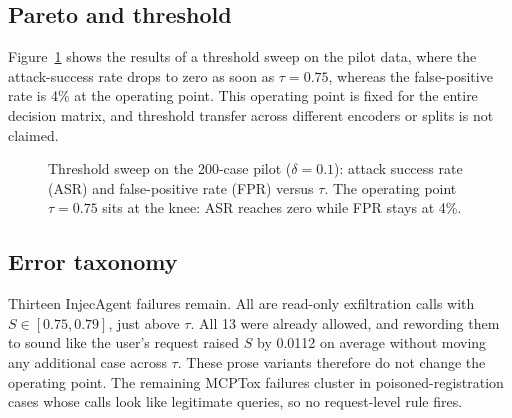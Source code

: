 \documentclass[a4paper,conference]{IEEEtran}
\begin{document}
\subsection{Pareto and threshold}
Figure~\ref{fig:sweep} shows the results of a threshold sweep on the pilot data, where the attack-success rate drops to zero as soon as $\tau=0.75$, whereas the false-positive rate is 4\% at the operating point. This operating point is fixed for the entire decision matrix, and threshold transfer across different encoders or splits is not claimed.

\begin{figure}[t]
  \centering
  \caption{Threshold sweep on the 200-case pilot ($\delta=0.1$): attack success rate (ASR) and false-positive rate (FPR) versus $\tau$. The operating point $\tau=0.75$ sits at the knee: ASR reaches zero while FPR stays at 4\%.}
  \label{fig:sweep}
\end{figure}

\subsection{Error taxonomy}
Thirteen InjecAgent failures remain. All are read-only exfiltration calls with $S \in [0.75,0.79]$, just above $\tau$. All 13 were already allowed, and rewording them to sound like the user's request raised $S$ by 0.0112 on average without moving any additional case across $\tau$. These prose variants therefore do not change the operating point. The remaining MCPTox failures cluster in poisoned-registration cases whose calls look like legitimate queries, so no request-level rule fires.
\end{document}
